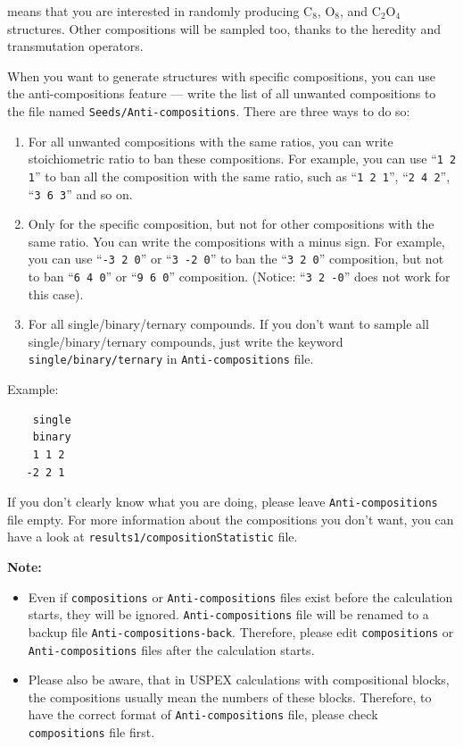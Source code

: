 \documentclass[12pt]{article}
\newcommand{\keyword}[1]{\texttt{#1}}
\newcommand{\file}[1]{\texttt{#1}}
\begin{document}
means that you are interested in randomly producing C$_8$, O$_8$, and C$_2$O$_4$
structures. Other compositions will be sampled too, thanks to the heredity and
transmutation operators.

When you want to generate structures with specific compositions, you can use the
anti-compositions feature --- write the list of all unwanted compositions to the
file named \file{Seeds/Anti-compositions}. There are three ways to do so:

\begin{enumerate}

\item For all unwanted compositions with the same ratios, you can write
stoichiometric ratio to ban these compositions. For example, you can use
``\texttt{1 2 1}'' to ban all the composition with the same ratio, such as
``\texttt{1 2 1}'', ``\texttt{2 4 2}'', ``\texttt{3 6 3}'' and so on.

\item Only for the specific composition, but not for other compositions with the
same ratio. You can write the compositions with a minus sign. For example, you
can use ``\texttt{-3 2 0}'' or ``\texttt{3 -2 0}'' to ban the ``\texttt{3 2 0}''
composition, but not to ban ``\texttt{6 4 0}'' or ``\texttt{9 6 0}''
composition. (Notice: ``\texttt{3 2 -0}'' does not work for this case).

\item For all single/binary/ternary compounds. If you don't want to sample all
single/binary/ternary compounds, just write the keyword
\keyword{single/binary/ternary} in \file{Anti-compositions} file.

\end{enumerate}

Example:

\begin{verbatim}
    single
    binary
    1 1 2
   -2 2 1
\end{verbatim}

If you don't clearly know what you are doing, please leave
\file{Anti-compositions} file empty. For more information about the compositions
you don't want, you can have a look at \file{results1/compositionStatistic}
file.

\textbf{Note:} 
\begin{itemize}

\item Even if \file{compositions} or \file{Anti-compositions} files exist before
the calculation starts, they will be ignored. \file{Anti-compositions} file will
be renamed to a backup file \file{Anti-compositions-back}. Therefore, please
edit \file{compositions} or \file{Anti-compositions} files after the calculation
starts.

\item Please also be aware, that in USPEX calculations with compositional
blocks, the compositions usually mean the numbers of these blocks. Therefore, to
have the correct format of \file{Anti-compositions} file, please check
\file{compositions} file first.

\end{itemize}
\end{document}
